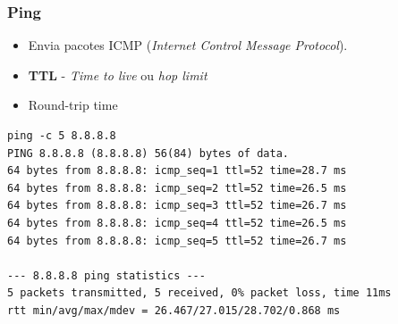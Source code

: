 \documentclass[xcolor=dvipsnames,10pt,compress,aspectratio=169]{beamer}
\begin{document}
\begin{frame}[fragile]
  \frametitle{Ping}
\begin{itemize}
	\item Envia pacotes ICMP (\emph{Internet Control Message Protocol}).
	\item \textbf{TTL} - \emph{Time to live} ou \emph{hop limit}
	\item Round-trip time
\end{itemize}
\begin{verbatim}
ping -c 5 8.8.8.8
PING 8.8.8.8 (8.8.8.8) 56(84) bytes of data.
64 bytes from 8.8.8.8: icmp_seq=1 ttl=52 time=28.7 ms
64 bytes from 8.8.8.8: icmp_seq=2 ttl=52 time=26.5 ms
64 bytes from 8.8.8.8: icmp_seq=3 ttl=52 time=26.7 ms
64 bytes from 8.8.8.8: icmp_seq=4 ttl=52 time=26.5 ms
64 bytes from 8.8.8.8: icmp_seq=5 ttl=52 time=26.7 ms

--- 8.8.8.8 ping statistics ---
5 packets transmitted, 5 received, 0% packet loss, time 11ms
rtt min/avg/max/mdev = 26.467/27.015/28.702/0.868 ms
\end{verbatim}
\end{frame}
\end{document}
